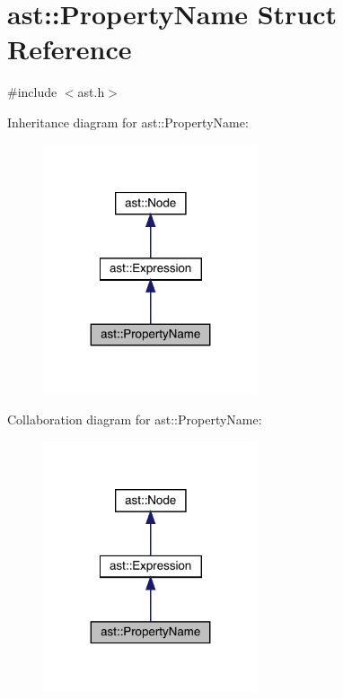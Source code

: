 \hypertarget{structast_1_1_property_name}{}\section{ast\+:\+:Property\+Name Struct Reference}
\label{structast_1_1_property_name}


{\ttfamily \#include $<$ast.\+h$>$}



Inheritance diagram for ast\+:\+:Property\+Name\+:\nopagebreak
\begin{figure}[H]
\begin{center}
\leavevmode
\includegraphics[width=179pt]{structast_1_1_property_name__inherit__graph}
\end{center}
\end{figure}


Collaboration diagram for ast\+:\+:Property\+Name\+:\nopagebreak
\begin{figure}[H]
\begin{center}
\leavevmode
\includegraphics[width=179pt]{structast_1_1_property_name__coll__graph}
\end{center}
\end{figure}
